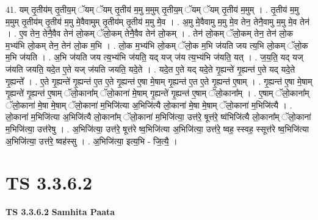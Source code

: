\documentclass[17pt]{extarticle}
\begin{document}
41. यम् तृ॒तीय॑म् तृ॒तीय॒म् ॅयम् ॅयम् तृ॒तीय॑ म॒मु म॒मुम् तृ॒तीय॒म् ॅयम् ॅयम् तृ॒तीय॑ म॒मुम् । . तृ॒तीय॑ म॒मु म॒मुम् तृ॒तीय॑म् तृ॒तीय॑ म॒मु मे॒वैवामुम् तृ॒तीय॑म् तृ॒तीय॑ म॒मु मे॒व । . अ॒मु मे॒वैवामु म॒मु मे॒व तेन॒ तेनै॒वामु म॒मु मे॒व तेन॑ । . ए॒व तेन॒ तेनै॒वैव तेन॑ लो॒कम् ॅलो॒कम् तेनै॒वैव तेन॑ लो॒कम् । . तेन॑ लो॒कम् ॅलो॒कम् तेन॒ तेन॑ लो॒क म॒भ्य॑भि लो॒कम् तेन॒ तेन॑ लो॒क म॒भि । . लो॒क म॒भ्य॑भि लो॒कम् ॅलो॒क म॒भि ज॑यति जय त्य॒भि लो॒कम् ॅलो॒क म॒भि ज॑यति । . अ॒भि ज॑यति जय त्य॒भ्य॑भि ज॑यति॒ यद् यज् ज॑य त्य॒भ्य॑भि ज॑यति॒ यत् । . ज॒य॒ति॒ यद् यज् ज॑यति जयति॒ यदे॒त ए॒ते यज् ज॑यति जयति॒ यदे॒ते । . यदे॒त ए॒ते यद् यदे॒ते गृ॒ह्यन्ते॑ गृ॒ह्यन्त॑ ए॒ते यद् यदे॒ते गृ॒ह्यन्ते᳚ । . ए॒ते गृ॒ह्यन्ते॑ गृ॒ह्यन्त॑ ए॒त ए॒ते गृ॒ह्यन्त॑ ए॒षा मे॒षाम् गृ॒ह्यन्त॑ ए॒त ए॒ते गृ॒ह्यन्त॑ ए॒षाम् । . गृ॒ह्यन्त॑ ए॒षा मे॒षाम् गृ॒ह्यन्ते॑ गृ॒ह्यन्त॑ ए॒षाम् ॅलो॒काना᳚म् ॅलो॒काना॑ मे॒षाम् गृ॒ह्यन्ते॑ गृ॒ह्यन्त॑ ए॒षाम् ॅलो॒काना᳚म् । . ए॒षाम् ॅलो॒काना᳚म् ॅलो॒काना॑ मे॒षा मे॒षाम् ॅलो॒काना॑ म॒भिजि॑त्या अ॒भिजि॑त्यै लो॒काना॑ मे॒षा मे॒षाम् ॅलो॒काना॑ म॒भिजि॑त्यै । . लो॒काना॑ म॒भिजि॑त्या अ॒भिजि॑त्यै लो॒काना᳚म् ॅलो॒काना॑ म॒भिजि॑त्या॒ उत्त॑रे॒ षूत्त॑रे॒ ष्व॑भिजि॑त्यै लो॒काना᳚म् ॅलो॒काना॑ म॒भिजि॑त्या॒ उत्त॑रेषु । . अ॒भिजि॑त्या॒ उत्त॑रे॒ षूत्त॑रे ष्व॒भिजि॑त्या अ॒भिजि॑त्या॒ उत्त॑रे॒ ष्वह॒ स्स्वह॒ स्सूत्त॑रे ष्व॒भिजि॑त्या अ॒भिजि॑त्या॒ उत्त॑रे॒ ष्वह॑स्सु । . अ॒भिजि॑त्या॒ इत्य॒भि - जि॒त्यै॒ । \newline
\pagebreak
{}

\section{ TS 3.3.6.2 }

\textbf{TS 3.3.6.2 } \newline
\textbf{Samhita Paata} \newline
\end{document}
